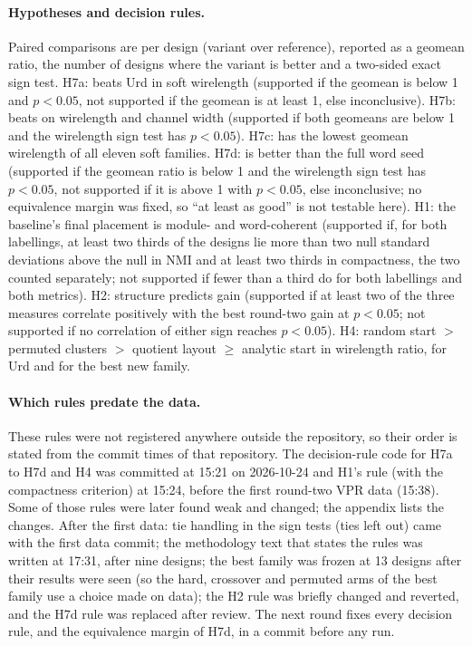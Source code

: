 \paragraph{Hypotheses and decision rules.}
Paired comparisons are per design (variant over reference), reported as a geomean ratio, the number of
designs where the variant is better and a two-sided exact sign test. H7a:  beats Urd in
soft wirelength (supported if the geomean is below 1 and $p<0.05$, not supported if the
geomean is at least 1, else inconclusive). H7b:  beats  on wirelength and
channel width (supported if both geomeans are below 1 and the wirelength sign test has $p<0.05$).
H7c:  has the lowest geomean wirelength of all eleven soft families. H7d: 
is better than the full word seed (supported if the geomean ratio is below 1 and the wirelength sign test has $p<0.05$, not supported
if it is above 1 with $p<0.05$, else inconclusive; no equivalence margin was fixed, so ``at least as good'' is not testable here).
H1: the baseline's final placement is module- and word-coherent (supported if, for both labellings,
at least two thirds of the designs lie more than two null standard deviations above the null in NMI and at least two thirds in
compactness, the two counted separately; not supported if fewer than a third do for both labellings and both metrics). H2: structure predicts gain (supported if at least two of the three
measures correlate positively with the best round-two gain at $p<0.05$; not supported if no
correlation of either sign reaches $p<0.05$). H4: random start $>$ permuted clusters $>$ quotient layout $\ge$ analytic start in
wirelength ratio, for Urd and for the best new family.

\paragraph{Which rules predate the data.}
These rules were not registered anywhere outside the repository, so their order is stated from the commit times of
that repository. The decision-rule code for H7a to H7d and H4 was committed at 15:21 on 2026-10-24 and H1's rule (with the compactness
criterion) at 15:24, before the first round-two VPR data (15:38). Some of those rules were later found weak and
changed; the appendix lists the changes. After the first data: tie handling in the sign tests (ties left out) came with the first data
commit; the methodology text that states the rules was written at 17:31, after nine designs; the best family was frozen at
13 designs after their results were seen (so the hard, crossover and permuted arms of the best family use a choice made
on data); the H2 rule was briefly changed and reverted, and the H7d rule was replaced after review. The next round fixes every decision rule, and the equivalence margin of
H7d, in a commit before any run.
